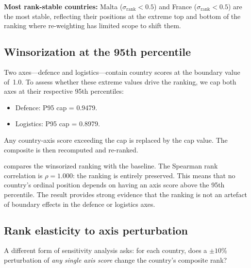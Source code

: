 \textbf{Most rank-stable countries:}  Malta ($\sigma_{\text{rank}} <
0.5$) and France ($\sigma_{\text{rank}} < 0.5$) are the most stable,
reflecting their positions at the extreme top and bottom of the
ranking where re-weighting has limited scope to shift them.

\subsection{Winsorization at the 95th percentile}\label{sec:winsorization}

Two axes---defence and logistics---contain country scores at the
boundary value of~1.0.  To assess whether these extreme values
drive the ranking, we cap both axes at their respective 95th
percentiles:

\begin{itemize}[leftmargin=2em]
  \item Defence: P95 cap = \num{0.9479}.
  \item Logistics: P95 cap = \num{0.8979}.
\end{itemize}

Any country-axis score exceeding the cap is replaced by the cap value.
The composite is then recomputed and re-ranked.



 compares the winsorized ranking with the
baseline.  The Spearman rank correlation is $\rho = 1.000$: the
ranking is entirely preserved.  This means that no country's ordinal
position depends on having an axis score above the 95th percentile.
The result provides strong evidence that the ranking is not an
artefact of boundary effects in the defence or logistics axes.

\subsection{Rank elasticity to axis perturbation}\label{sec:rank-elasticity}

A different form of sensitivity analysis asks: for each country,
does a $\pm 10\%$ perturbation of \emph{any single axis score}
change the country's composite rank?

